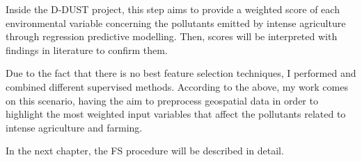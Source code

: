 \bigbreak
Inside the D-DUST project, this step aims to provide a weighted score of each environmental variable concerning the pollutants emitted by intense agriculture through regression predictive modelling. Then, scores will be interpreted with findings in literature to confirm them.\newline
\par
Due to the fact that there is no best feature selection techniques, I performed and combined different supervised methods. 
\bigbreak
According to the above, my work comes on this scenario, having the aim to preprocess geospatial data in order to highlight the most weighted input variables that affect the pollutants related to intense agriculture and farming.\par
In the next chapter, the FS procedure will be described in detail.


